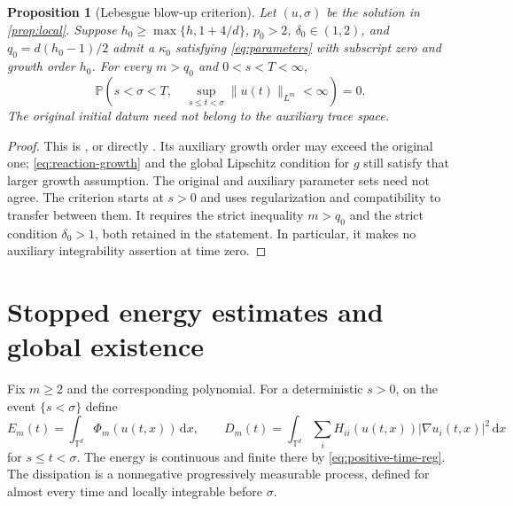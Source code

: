 \documentclass[11pt]{amsart}
\newtheorem{proposition}[theorem]{Proposition}
\theoremstyle{definition}
\newcommand{\T}{\mathbb T}
\newcommand{\PP}{\mathbb P}
\newcommand{\dd}{\,\mathrm d}
\numberwithin{equation}{section}
\begin{document}
\begin{proposition}[Lebesgue blow-up criterion]\label{prop:blowup}
Let $(u,\sigma)$ be the solution in \cref{prop:local}. Suppose
$h_0\geq\max\{h,1+4/d\}$, $p_0>2$, $\delta_0\in(1,2)$, and
$q_0=d(h_0-1)/2$ admit a $\kappa_0$ satisfying
\eqref{eq:parameters} with subscript zero and growth order $h_0$.
For every $m>q_0$ and $0<s<T<\infty$,
\begin{equation}\label{eq:blowup}
\PP\left(s<\sigma<T,\quad
 \sup_{s\leq t<\sigma}\|u(t)\|_{L^m}<\infty\right)=0.
\end{equation}
The original initial datum need not belong to the auxiliary trace space.
\end{proposition}
\begin{proof}
This is \cite[Theorem~8.9(1), p.~100]{AVsurvey}, or directly
\cite[Corollary~2.11(1), p.~12]{AVlocal}. Its auxiliary growth order
may exceed the original one; \eqref{eq:reaction-growth} and the global
Lipschitz condition for $g$ still satisfy that larger growth assumption.
The original and auxiliary parameter sets need not agree. The criterion
starts at $s>0$ and uses regularization and compatibility to transfer
between them. It requires the strict inequality $m>q_0$ and the strict
condition $\delta_0>1$, both retained in the statement. In particular,
it makes no auxiliary integrability assertion at time zero.
\end{proof}

\section{Stopped energy estimates and global existence}\label{sec:global}

Fix $m\geq2$ and the corresponding polynomial. For a deterministic
$s>0$, on the event $\{s<\sigma\}$ define
\begin{equation}\label{eq:energy-dissipation}
E_m(t)=\int_{\T^d}\Phi_m(u(t,x))\dd x,\qquad
D_m(t)=\int_{\T^d}\sum_i H_{ii}(u(t,x))|\nabla u_i(t,x)|^2\dd x
\end{equation}
for $s\leq t<\sigma$. The energy is continuous and finite there by
\eqref{eq:positive-time-reg}. The dissipation is a nonnegative
progressively measurable process, defined for almost every time and
locally integrable before $\sigma$.
\end{document}
